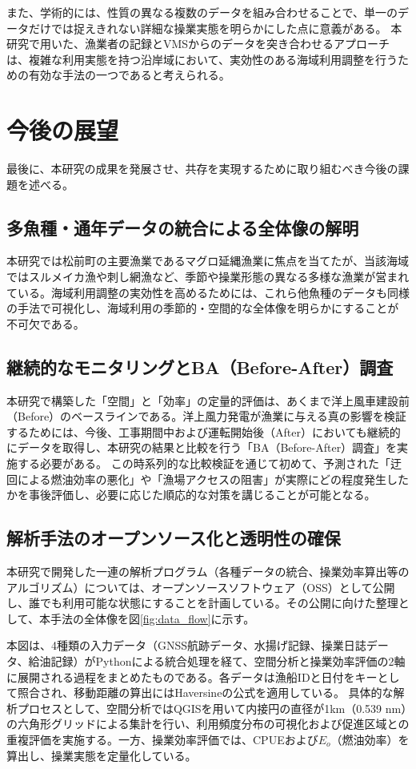 また、学術的には、性質の異なる複数のデータを組み合わせることで、単一のデータだけでは捉えきれない詳細な操業実態を明らかにした点に意義がある。
本研究で用いた、漁業者の記録とVMSからのデータを突き合わせるアプローチは、複雑な利用実態を持つ沿岸域において、実効性のある海域利用調整を行うための有効な手法の一つであると考えられる。

\section{今後の展望}
最後に、本研究の成果を発展させ、共存を実現するために取り組むべき今後の課題を述べる。

\subsection{多魚種・通年データの統合による全体像の解明}
本研究では松前町の主要漁業であるマグロ延縄漁業に焦点を当てたが、当該海域ではスルメイカ漁や刺し網漁など、季節や操業形態の異なる多様な漁業が営まれている。海域利用調整の実効性を高めるためには、これら他魚種のデータも同様の手法で可視化し、海域利用の季節的・空間的な全体像を明らかにすることが不可欠である。

\subsection{継続的なモニタリングとBA（Before-After）調査}
本研究で構築した「空間」と「効率」の定量的評価は、あくまで洋上風車建設前（Before）のベースラインである。洋上風力発電が漁業に与える真の影響を検証するためには、今後、工事期間中および運転開始後（After）においても継続的にデータを取得し、本研究の結果と比較を行う「BA（Before-After）調査」を実施する必要がある。
この時系列的な比較検証を通じて初めて、予測された「迂回による燃油効率の悪化」や「漁場アクセスの阻害」が実際にどの程度発生したかを事後評価し、必要に応じた順応的な対策を講じることが可能となる。

\subsection{解析手法のオープンソース化と透明性の確保}
本研究で開発した一連の解析プログラム（各種データの統合、操業効率算出等のアルゴリズム）については、オープンソースソフトウェア（OSS）として公開し、誰でも利用可能な状態にすることを計画している。その公開に向けた整理として、本手法の全体像を図\ref{fig:data_flow}に示す。

本図は、4種類の入力データ（GNSS航跡データ、水揚げ記録、操業日誌データ、給油記録）がPythonによる統合処理を経て、空間分析と操業効率評価の2軸に展開される過程をまとめたものである。各データは漁船IDと日付をキーとして照合され、移動距離の算出にはHaversineの公式を適用している。
具体的な解析プロセスとして、空間分析ではQGISを用いて内接円の直径が1km（0.539 nm）の六角形グリッドによる集計を行い、利用頻度分布の可視化および促進区域との重複評価を実施する。一方、操業効率評価では、CPUEおよび$E_o$（燃油効率）を算出し、操業実態を定量化している。

